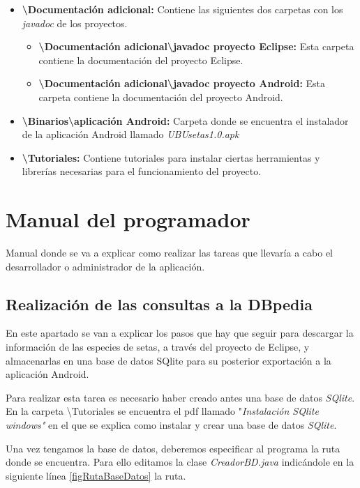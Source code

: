 \begin{itemize}
	\item \textbf{\textbackslash Documentación adicional:} Contiene las siguientes dos carpetas con los \textit{javadoc} de los proyectos.
	\begin{itemize}
	 	\item \textbf{\textbackslash Documentación adicional\textbackslash javadoc proyecto Eclipse:} Esta carpeta contiene la documentación del proyecto Eclipse.
	 	\item \textbf{\textbackslash Documentación adicional\textbackslash javadoc proyecto Android:} Esta carpeta contiene la documentación del proyecto Android.
	\end{itemize}
	 
	\item \textbf{\textbackslash Binarios\textbackslash aplicación Android:} Carpeta donde se encuentra el instalador de la aplicación Android llamado \textit{UBUsetas1.0.apk}
	 
	\item \textbf{\textbackslash Tutoriales:} Contiene tutoriales para instalar ciertas herramientas y librerías necesarias para el funcionamiento del proyecto.
	
\end{itemize}

\section{Manual del programador}

Manual donde se va a explicar como realizar las tareas que llevaría a cabo el desarrollador o administrador de la aplicación.

\subsection{Realización de las consultas a la DBpedia}

En este apartado se van a explicar los pasos que hay que seguir para descargar la información de las especies de setas, a través del proyecto de Eclipse, y almacenarlas en una base de datos SQlite para su posterior exportación a la aplicación Android.

Para realizar esta tarea es necesario haber creado antes una base de datos \textit{SQlite}. En la carpeta \textbackslash Tutoriales se encuentra el pdf llamado "\textit{Instalación SQlite windows"} en el que se explica como instalar y crear una base de datos \textit{SQlite}.

Una vez tengamos la base de datos, deberemos especificar al programa la ruta donde se encuentra. Para ello editamos la clase \textit{CreadorBD.java} indicándole en la siguiente línea \ref{figRutaBaseDatos} la ruta.

